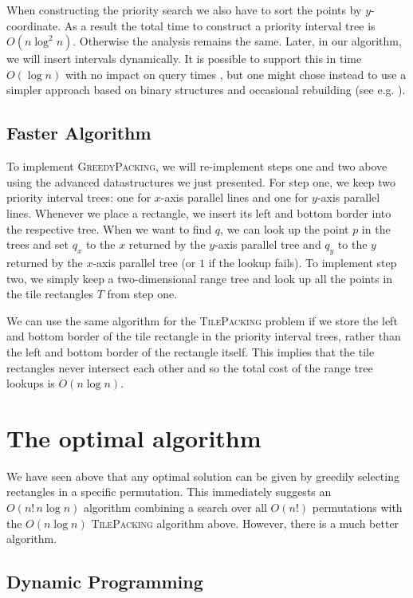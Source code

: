 \documentclass[11pt, a4paper, twocolumn]{article}
\begin{document}
When constructing the priority search we also have to sort the points by $y$-coordinate.
As a result the total time to construct a priority interval tree is $O(n \log^2 n)$.
Otherwise the analysis remains the same. Later, in our algorithm, we will insert intervals
dynamically. It is possible to support this in time $O(\log n)$ with no impact on query
times \cite{widmayer1993algorithmen}, but one might chose instead to use a simpler approach based on binary structures
and occasional rebuilding (see e.g. \cite[p.~110]{klein2006algorithmische}).

\subsection{Faster Algorithm}

To implement \textsc{GreedyPacking}, we will re-implement steps one and two above
using the advanced datastructures we just presented. For step one, we keep two
priority interval trees: one for $x$-axis parallel lines and one for $y$-axis
parallel lines. Whenever we place a rectangle, we insert its left and bottom
border into the respective tree. When we want to find $q$, we can look up the
point $p$ in the trees and set $q_x$ to the $x$ returned by the $y$-axis parallel tree
and $q_y$ to the $y$ returned by the $x$-axis parallel tree (or $1$ if the lookup fails).
To implement step two, we simply keep a two-dimensional range tree and look up all
the points in the tile rectangles $T$ from step one.

We can use the same algorithm for the \textsc{TilePacking} problem if we store
the left and bottom border of the tile rectangle in the priority interval trees,
rather than the left and bottom border of the rectangle itself. This implies that
the tile rectangles never intersect each other and so the total cost of the range
tree lookups is $O(n\log n)$.

\section{The optimal algorithm}
\label{optimal}

We have seen above that any optimal solution can be given by greedily selecting
rectangles in a specific permutation. This immediately suggests an $O(n!\,n \log n)$
algorithm combining a search over all $O(n!)$ permutations with the $O(n \log n)$
\textsc{TilePacking} algorithm above. However, there is a much better algorithm.

\subsection{Dynamic Programming}
\end{document}
